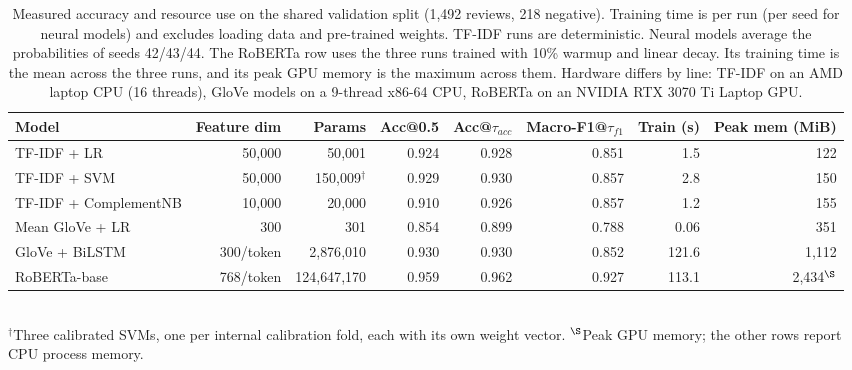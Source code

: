 \begin{table}[!htbp]
\centering
\caption{Measured accuracy and resource use on the shared validation split (1{,}492 reviews, 218 negative). Training time is per run (per seed for neural models) and excludes loading data and pre-trained weights. TF-IDF runs are deterministic. Neural models average the probabilities of seeds 42/43/44. The RoBERTa row uses the three runs trained with 10\% warmup and
linear decay. Its training time is the mean across the three runs,
and its peak GPU memory is the maximum across them. Hardware differs by line: TF-IDF on an AMD laptop CPU (16 threads), GloVe models on a 9-thread x86-64 CPU, RoBERTa on an NVIDIA RTX 3070 Ti Laptop GPU.}
\label{tab:g-measured}
\footnotesize
\setlength{\tabcolsep}{3pt}
\begin{tabular}{l r r r r r r r}
\toprule
Model & Feature dim & Params & Acc@0.5 & Acc@$\tau_{acc}$ & Macro-F1@$\tau_{f1}$ & Train (s) & Peak mem (MiB) \\
\midrule
TF-IDF + LR            & 50{,}000 & 50{,}001  & 0.924 & 0.928 & 0.851 & 1.5 & 122 \\
TF-IDF + SVM     & 50{,}000 & 150{,}009$^{\dagger}$ & 0.929 & 0.930 & 0.857 & 2.8 & 150 \\
TF-IDF + ComplementNB  & 10{,}000 & 20{,}000  & 0.910 & 0.926 & 0.857 & 1.2 & 155 \\
Mean GloVe + LR & 300 & 301 & 0.854 & 0.899 & 0.788 & 0.06 & 351 \\
GloVe + BiLSTM & 300/token & 2{,}876{,}010 & 0.930 & 0.930 & 0.852 & 121.6 & 1{,}112 \\
RoBERTa-base & 768/token & 124{,}647{,}170 & 0.959 & 0.962 & 0.927 & 113.1 & 2{,}434$^{\S}$ \\
\bottomrule
\end{tabular}\\[2pt]
\footnotesize $^{\dagger}$Three calibrated SVMs, one per internal calibration fold, each with its own weight vector.
$^{\S}$Peak GPU memory; the other rows report CPU process memory.
\end{table}

